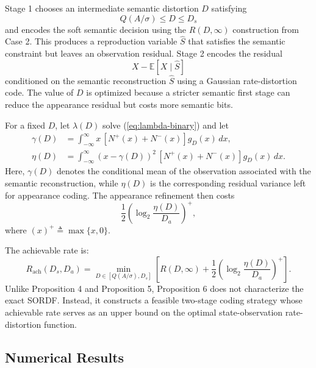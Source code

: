 \documentclass[conference]{IEEEtran}
\begin{document}
Stage 1 chooses an intermediate semantic distortion $D$ satisfying
\begin{equation}
Q(A/\sigma)\leq D\leq D_s
\label{eq:D_feasible}
\end{equation}
and encodes the soft semantic decision using the $R(D,\infty)$ construction from Case 2. This produces a reproduction variable $\hat{S}$ that satisfies the semantic constraint but leaves an observation residual. Stage 2 encodes the residual 
\begin{equation}
X - \mathbb{E}[X \mid \hat{S}]
\label{eq:residual}
\end{equation}
conditioned on the semantic reconstruction $\hat{S}$ using a Gaussian rate-distortion code. The value of $D$ is optimized because a stricter semantic first stage can reduce the appearance residual but costs more semantic bits.

For a fixed $D$, let $\lambda(D)$ solve (\ref{eq:lambda-binary}) and let
\begin{align}
\gamma(D) &= \int_{-\infty}^{\infty} x \, [N^+(x) + N^-(x)] g_D(x) \, dx, \label{eq:gamma_def} \\
\eta(D) &= \int_{-\infty}^{\infty} (x - \gamma(D))^2 \, [N^+(x) + N^-(x)] g_D(x) \, dx. \label{eq:eta_def}
\end{align}
Here, $\gamma(D)$ denotes the conditional mean of the observation associated with the semantic reconstruction, while $\eta(D)$ is the corresponding residual variance left for appearance coding. The appearance refinement then costs
\begin{equation}
\frac{1}{2} \left( \log_2 \frac{\eta(D)}{D_a} \right)^+,
\label{eq:refinement_cost}
\end{equation}
where $(x)^+ \triangleq \max\{x, 0\}$.

The achievable rate is:
\begin{equation}
R_{\text{ach}}(D_s, D_a) = \min_{D \in [Q(A/\sigma), D_s]} \left[ R(D, \infty) + \frac{1}{2}\left(\log_2 \frac{\eta(D)}{D_a}\right)^+ \right].
\label{eq:rach_def}
\end{equation}
Unlike Proposition 4 and Proposition 5, Proposition 6 does not characterize the exact SORDF. Instead, it constructs a feasible two-stage coding strategy whose achievable rate serves as an upper bound on the optimal state-observation rate-distortion function.

\subsection{Numerical Results}
\end{document}
